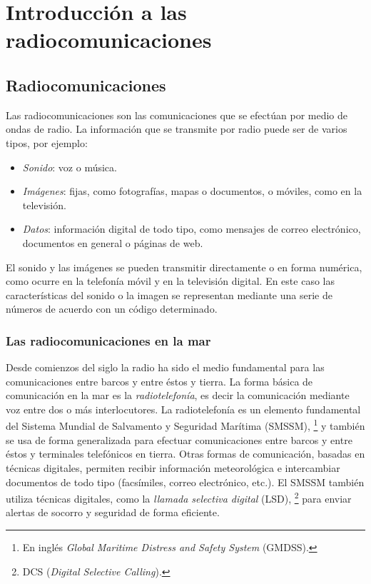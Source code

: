 \chapter{Introducción a las radiocomunicaciones}

\section{Radiocomunicaciones}

Las radiocomunicaciones son las comunicaciones que se efectúan por medio de ondas de radio. La información que se transmite por radio puede ser de varios tipos, por ejemplo:
%
\begin{itemize}
\item \emph{Sonido}: voz o música.
\item \emph{Imágenes}: fijas, como fotografías,  mapas o documentos, o móviles, como en la televisión.
\item \emph{Datos}: información digital de todo tipo, como mensajes de correo electrónico, documentos en general o páginas de web.
\end{itemize}
%
El sonido y las imágenes se pueden transmitir directamente o en forma numérica, como ocurre en la telefonía móvil y en la televisión digital. En este caso las características del sonido o la imagen se representan mediante una serie de números de acuerdo con un código determinado.

\subsection{Las radiocomunicaciones en la mar}

Desde comienzos del siglo  la radio ha sido el medio fundamental para las comunicaciones entre barcos y entre éstos y tierra. La forma básica de comunicación en la mar es la \emph{radiotelefonía}, es decir la comunicación mediante voz entre dos o más interlocutores. 
La radiotelefonía es un elemento fundamental del Sistema Mundial de Salvamento y Seguridad Marítima  (SMSSM),%
\footnote{En inglés \emph{Global Maritime Distress and Safety System} (GMDSS).}
y también se usa de forma generalizada para efectuar comunicaciones entre barcos y entre éstos y terminales telefónicos en tierra. Otras formas de comunicación, basadas en técnicas digitales, permiten recibir información meteorológica e intercambiar documentos de todo tipo (facsímiles, correo electrónico, etc.). El SMSSM también utiliza técnicas digitales, como la \emph{llamada selectiva digital} (LSD),%
\footnote{DCS (\emph{Digital Selective Calling}).}
para enviar alertas de socorro y seguridad de forma eficiente.

